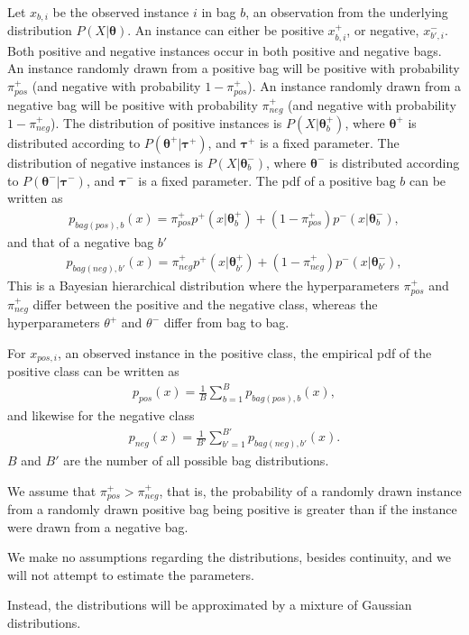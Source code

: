 Let $x_{b,i}$ be the observed instance $i$ in bag $b$, an observation from the underlying distribution $P(X|\mathbf{\theta})$.
An instance can either be positive $x_{b,i}^+$, or negative, $x_{b',i}^-$.
Both positive and negative instances occur in both positive and negative bags.
An instance randomly drawn from a positive bag will be positive with probability $\pi_{pos}^+$ (and negative with probability $1-\pi_{pos}^+$).
An instance randomly drawn from a negative bag will be positive with probability $\pi_{neg}^+$ (and negative with probability $1-\pi_{neg}^+$).
The distribution of positive instances is $P(X|\mathbf{\theta}_b^+)$, where $\mathbf{\theta}^+$ is distributed according to $P(\mathbf{\theta}^+|\mathbf{\tau}^+)$, and $\mathbf{\tau}^+$ is a fixed parameter.
The distribution of negative instances is $P(X|\mathbf{\theta}_b^-)$, where $\mathbf{\theta}^-$ is distributed according to $P(\mathbf{\theta}^-|\mathbf{\tau}^-)$, and $\mathbf{\tau}^-$ is a fixed parameter.
The pdf of a positive bag $b$ can be written as
\begin{align}
  p_{bag(pos),b}(x) = \pi_{pos}^+p^+(x|\mathbf{\theta}_b^+) + (1-\pi_{pos}^+) p^-(x|\mathbf{\theta}_b^-),
\end{align}
and that of a negative bag $b'$
\begin{align}
  p_{bag(neg),b'}(x) = \pi_{neg}^+p^+(x|\mathbf{\theta}_{b'}^+) + (1-\pi_{neg}^+) p^-(x|\mathbf{\theta}_{b'}^-),
\end{align}
This is a Bayesian hierarchical distribution where the hyperparameters $\pi_{pos}^+$ and $\pi_{neg}^+$ differ between the positive and the negative class, whereas the hyperparameters $\theta^+$ and $\theta^-$ differ from bag to bag. 

For $x_{pos,i}$, an observed instance in the positive class, the empirical pdf of the positive class can be written as
\begin{align}
  p_{pos}(x) = \frac{1}{B}\sum_{b = 1}^B  p_{bag(pos),b}(x), 
\end{align}
and likewise for the negative class
\begin{align}
  p_{neg}(x) = \frac{1}{B'}\sum_{b' = 1}^{B'}  p_{bag(neg),{b'}}(x). 
\end{align}
$B$ and $B'$ are the number of all possible bag distributions. 

We assume that $\pi_{pos}^+ > \pi_{neg}^+$, that is, the probability of a randomly drawn instance from a randomly drawn positive bag being positive is greater than if the instance were drawn from a negative bag. 

We make no assumptions regarding the distributions, besides continuity, and we will not attempt to estimate the parameters. 

Instead, the distributions will be approximated by a mixture of Gaussian distributions. 